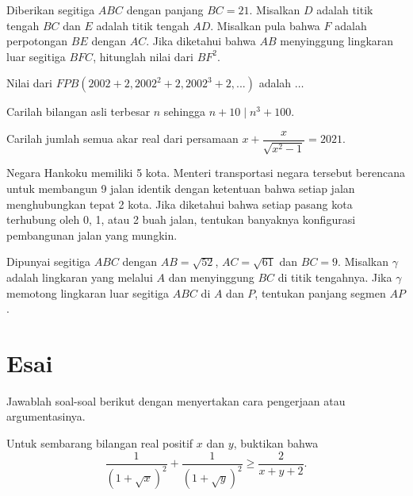 \documentclass[11pt]{scrartcl}
\begin{document}
	
	
	\begin{soalbaru}
		Diberikan segitiga $ABC$ dengan panjang $BC = 21$. Misalkan $D $ adalah titik tengah
		$BC $ dan $E $ adalah titik tengah $AD$. Misalkan pula bahwa $F $ adalah perpotongan $BE$
		dengan $AC$. Jika diketahui bahwa $AB $ menyinggung lingkaran luar segitiga $BFC$,
		hitunglah nilai dari $BF^2$.
	\end{soalbaru}
	
	\begin{soalbaru}
		Nilai dari $FPB(2002+2,2002^2+2,2002^3+2,...)$ adalah $\dots$
	\end{soalbaru}
	
	\begin{soalbaru}
		Carilah bilangan asli terbesar $n$ sehingga $n+10 \mid n^3+100$.
	\end{soalbaru}
	
	\begin{soalbaru}
		Carilah jumlah semua akar real dari persamaan $x+\dfrac{x}{\sqrt{x^2-1}}=2021.$
	\end{soalbaru}
	
	\begin{soalbaru}
		Negara Hankoku memiliki 5 kota. Menteri transportasi negara tersebut berencana untuk
		membangun 9 jalan identik dengan ketentuan bahwa setiap jalan menghubungkan
		tepat 2 kota. Jika diketahui bahwa setiap pasang kota terhubung oleh 0, 1, atau 2
		buah jalan, tentukan banyaknya konfigurasi pembangunan jalan yang mungkin.
	\end{soalbaru}
	
	\begin{soalbaru}
		Dipunyai segitiga $ABC $ dengan $AB = \sqrt{52}$, $AC=\sqrt{61}$ dan $BC = 9$. Misalkan $\gamma$
		adalah lingkaran yang melalui $A$ dan menyinggung $BC$ di titik tengahnya. Jika $\gamma$
		memotong lingkaran luar segitiga $ABC$ di $A$ dan $P$, tentukan panjang segmen $AP$.
	\end{soalbaru}
	
	\section{Esai}
	Jawablah soal-soal berikut dengan menyertakan cara pengerjaan atau argumentasinya.
	
	\begin{soalbaru}
	Untuk sembarang bilangan real positif $x$ dan $y$, buktikan bahwa $$\dfrac{1}{(1+\sqrt{x})^2}+\dfrac{1}{(1+\sqrt{y})^2} \ge \dfrac{2}{x+y+2}.$$
	\end{soalbaru}
	
\end{document}
